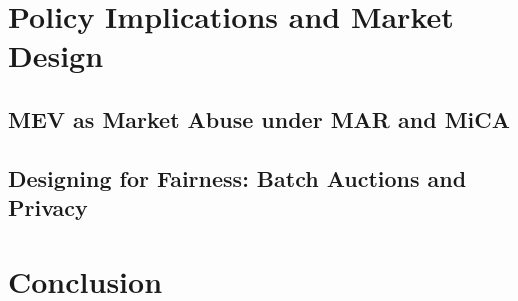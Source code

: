 \documentclass[pdflatex, sn-basic]{sn-jnl}
\theoremstyle{thmstylethree}%
\begin{document}


	\section{Policy Implications and Market Design}
	\label{sec:policy-implications}

	\subsection{MEV as Market Abuse under MAR and MiCA}
	\label{subsec:regulatory-implications}


	\subsection{Designing for Fairness: Batch Auctions and Privacy}
	\label{subsec:market-design}


	\section{Conclusion}
	\label{sec:conclusion}


\end{document}
